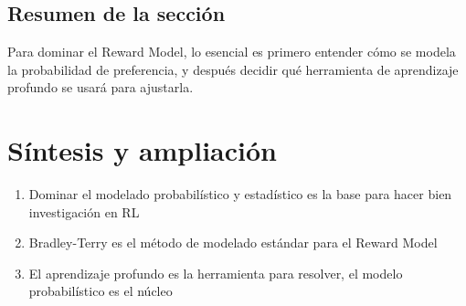 \documentclass[a4paper]{article}
\begin{document}
\subsection{Resumen de la sección}
Para dominar el Reward Model, lo esencial es primero entender cómo se modela la probabilidad de preferencia, y después decidir qué herramienta de aprendizaje profundo se usará para ajustarla.

\newpage
\section{Síntesis y ampliación}
\begin{enumerate}
  \item Dominar el modelado probabilístico y estadístico es la base para hacer bien investigación en RL
  \item Bradley-Terry es el método de modelado estándar para el Reward Model
  \item El aprendizaje profundo es la herramienta para resolver, el modelo probabilístico es el núcleo
\end{enumerate}
\end{document}

